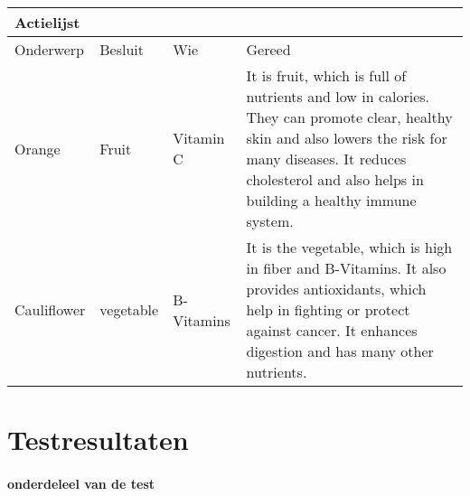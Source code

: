  \newpage
 
 
 
 
 
 
 
 
 \begin{center}  
 	\begin{tabular}{ | l | l | l | p{5cm} |} %
 		\hline  
 		\multicolumn{4}{|l|}{Actielijst} \\ \hline  
 		Onderwerp & Besluit & Wie &Gereed \\ \hline  
 		Orange & Fruit & Vitamin C & It is fruit, which is full of nutrients and low in calories. They can promote clear, healthy skin and also lowers the risk for many diseases. It reduces cholesterol and also helps in building a healthy immune system.\\ \hline  
 		
 		Cauliflower & vegetable & B-Vitamins & It is the vegetable, which is high in fiber and B-Vitamins. It also provides antioxidants, which help in fighting or protect against cancer. It enhances digestion and has many other nutrients.\\ \hline  
 		
 	\end{tabular}  
 \end{center}  
 
 
 
 
 \chapter{Testresultaten}
 
 
 
 \subsubsection{onderdeleel van de test}
 
 
 
